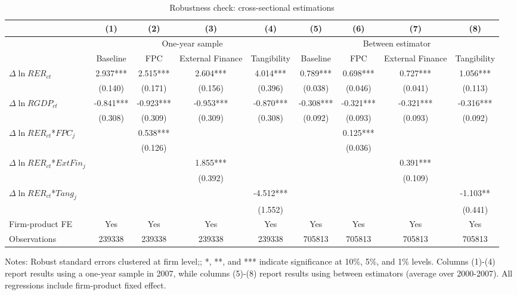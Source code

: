 \documentclass[12pt]{article}
\begin{document}
\begin{table}
	\centering
	\caption{Robustness check: cross-sectional estimations}
	\begin{threeparttable}
		\begin{tabular}{lcccccccc}
			\toprule
			& (1)   & (2)   & (3)   & (4) &  (5)  &  (6)  & (7)  & (8)\\
			\midrule
			& \multicolumn{4}{c}{One-year sample} & \multicolumn{4}{c}{Between estimator}\\
			& Baseline & FPC   & External Finance & Tangibility & Baseline & FPC & External Finance & Tangibility\\
			\midrule
			$\Delta \ln RER_{ct}$ & 2.937*** & 2.515*** & 2.604*** & 4.014*** & 0.789*** & 0.698*** & 0.727*** & 1.056***\\
			& (0.140) & (0.171) & (0.156) & (0.396) & (0.038) & (0.046) & (0.041) & (0.113)\\
			$\Delta \ln RGDP_{ct}$ & -0.841*** & -0.923*** & -0.953*** & -0.870*** & -0.308*** & -0.321*** & -0.321*** & -0.316***\\
			& (0.308) & (0.309) & (0.309) & (0.308) & (0.092) & (0.093) & (0.093) & (0.092)\\
			$\Delta \ln RER_{ct}$*$FPC_{j}$ &       & 0.538*** &       &  && 0.125*** &&\\
			&       & (0.126) &       &  && (0.036) &&\\
			$\Delta \ln RER_{ct}$*$ExtFin_{j}$ &       &       & 1.855*** &  & &  & 0.391*** & \\
			&       &       & (0.392) &  &&  & (0.109) &\\
			$\Delta \ln RER_{ct}$*$Tang_{j}$ &       &       &       & -4.512*** &&&& -1.103** \\
			&       &       &       & (1.552) &&&& (0.441)\\
			Firm-product FE &  Yes   & Yes   & Yes   & Yes &Yes   & Yes   & Yes   & Yes\\
			Observations & 239338 & 239338 & 239338 & 239338 & 705813 & 705813 & 705813 & 705813\\
			\bottomrule
		\end{tabular}
		\begin{tablenotes}
			\footnotesize
			\item[Notes:] Robust standard errors clustered at firm level;; *, **, and *** indicate significance at 10\%, 5\%, and 1\% levels. Columns (1)-(4) report results using a one-year sample in 2007, while columns (5)-(8) report results using between estimators (average over 2000-2007). All regressions include firm-product fixed effect.
		\end{tablenotes}
	\end{threeparttable}
	\label{tab.robust.crosec}
\end{table}
\end{document}
